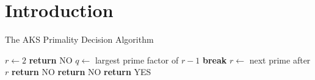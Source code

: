 \documentclass[./Thesis.tex]{subfiles}
\begin{document}
\chapter*{Introduction}

\begin{algorithm}[H]
  \caption{The AKS Primality Decision Algorithm}
  \label{fig:prime-slow}
  \begin{algorithmic}
    \State $r \leftarrow 2$
        \State \textbf{return} NO
      \EndIf
      \State $q \leftarrow$ largest prime factor of $r - 1$
        \State \textbf{break}
      \EndIf
      \State $r \leftarrow$ next prime after $r$
    \EndWhile
        \State \textbf{return} NO
      \EndIf
    \EndFor
      \State \textbf{return} NO
    \Else
      \State \textbf{return} YES
    \EndIf
    \EndFunction
  \end{algorithmic}
\end{algorithm}


\end{document}
